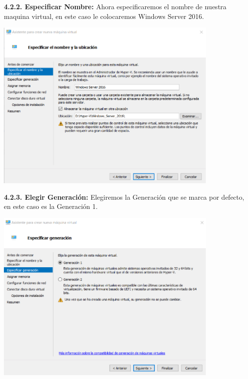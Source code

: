 \textbf {4.2.2. Especificar Nombre:} Ahora especificaremos el nombre de nuestra maquina virtual, en este caso le colocaremos Windows Server 2016.
\begin{center}
  \includegraphics[width=11cm]{Imagenes/Especificar_Nombre_Ruta.png}
\end{center}
\break

\textbf {4.2.3. Elegir Generación:} Elegiremos la Generación que se marca por defecto, en este caso es la Generación 1.
\begin{center}
  \includegraphics[width=11cm]{Imagenes/Especificar_Generacion.png}
\end{center}

